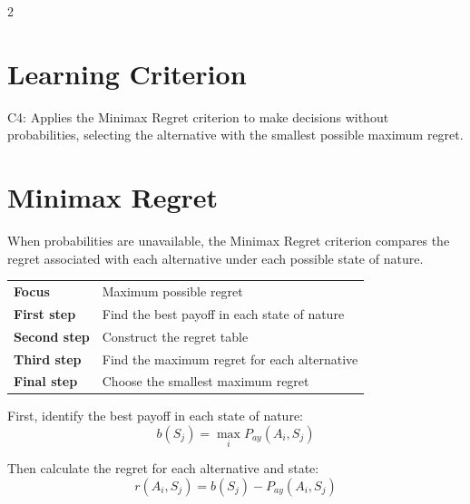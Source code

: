 	\begin{multicols}{2}
		
		
		\section*{Learning Criterion}
		
		C4: Applies the Minimax Regret criterion to make decisions without
		probabilities, selecting the alternative with the smallest possible
		maximum regret. \vspace{-5mm}
		
		
		\section{Minimax Regret}
		
		When probabilities are unavailable, the Minimax Regret criterion compares
		the regret associated with each alternative under each possible state of
		nature.

		\begin{center}
			\renewcommand{\arraystretch}{1.3}
			\small
			\begin{tabular}{p{}p{}}
				\toprule
				\textbf{Focus}
				& Maximum possible regret \\
				\textbf{First step}
				& Find the best payoff in each state of nature \\
				\textbf{Second step}
				& Construct the regret table \\
				\textbf{Third step}
				& Find the maximum regret for each alternative \\
				\textbf{Final step}
				& Choose the smallest maximum regret \\
				\bottomrule
			\end{tabular}
		\end{center}
		
		First, identify the best payoff in each state of nature:
		\[
		\boxed{
			b(S_j)
			=
			\max_i P_{ay}(A_i,S_j)
		}
		\]
		
		Then calculate the regret for each alternative and state:
		\[
		\boxed{
			r(A_i,S_j)
			=
			b(S_j)-P_{ay}(A_i,S_j)
		}
		\]
		

\end{multicols}
